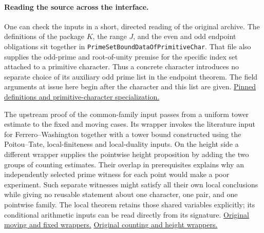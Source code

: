 \documentclass[12pt,letterpaper]{article}
\begin{document}
\paragraph{Reading the source across the interface.}
One can check the inputs in a short, directed reading of the original archive. The definitions of the package $K$, the range $J$, and the even and odd endpoint obligations sit together in \texttt{PrimeSetBoundDataOfPrimitiveChar}. That file also supplies the odd-prime and root-of-unity premise for the specific index set attached to a primitive character. Thus a concrete character introduces no separate choice of its auxiliary odd prime list in the endpoint theorem. The field arguments at issue here begin after the character and this list are given. \href{https://github.com/nousentllc/riemann-hypothesis/blob/40e56bab026552e089d7afcfeff08d2defb9c005/src/Development/AutomorphicArithmetic/AutomorphicVarieties/PrimeSetBoundDataOfPrimitiveChar.lean}{Pinned definitions and primitive-character specialization.}

The upstream proof of the common-family input passes from a uniform tower estimate to the fixed and moving cases. Its wrapper invokes the literature input for Ferrero--Washington together with a tower bound constructed using the Poitou--Tate, local-finiteness and local-duality inputs. On the height side a different wrapper supplies the pointwise height proposition by adding the two groups of counting estimates. Their overlap in prerequisites explains why an independently selected prime witness for each point would make a poor experiment. Such separate witnesses might satisfy all their own local conclusions while giving no reusable statement about one character, one pair, and one pointwise family. The local theorem retains those shared variables explicitly; its conditional arithmetic inputs can be read directly from its signature. \href{https://github.com/nousentllc/riemann-hypothesis/blob/40e56bab026552e089d7afcfeff08d2defb9c005/src/Development/AutomorphicArithmetic/AutomorphicVarieties/LayeredIsomorphisms/ThmBabOfLemmaK.lean}{Original moving and fixed wrappers.} \href{https://github.com/nousentllc/riemann-hypothesis/blob/40e56bab026552e089d7afcfeff08d2defb9c005/src/Development/AutomorphicArithmetic/AutomorphicVarieties/HeightAndVanishing/JointWinOfCounts.lean}{Original counting and height wrappers.}
\end{document}
